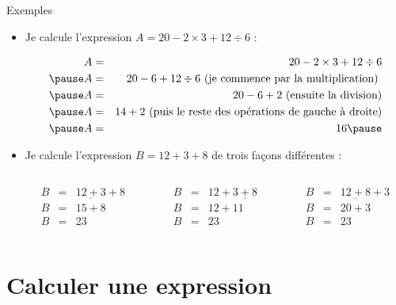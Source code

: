 \documentclass[xcolor={dvipsnames}]{beamer}
\newcommand{\myitem}{\item[\textbullet]}
\begin{document}
\begin{frame}
	\begin{exampleblock}{Exemples}
		\begin{itemize}
			\myitem Je calcule l'expression $A= 20 - 2 \times 3 + 12 \div 6$ :\pause
			
			\vspace*{-0.5cm}
			
			\begin{eqnarray*}
				A &=& 20 - 2 \times 3 + 12 \div 6 \\ \pause
				A &=& 20 - 6 + 12 \div 6 \text{ (je commence par la multiplication) }\\ \pause
				A &=& 20 - 6 + 2 \text{ (ensuite la division)} \\ \pause
				A &=& 14 + 2 \text{ (puis le reste des opérations de gauche à droite)}\\ \pause
				A &=& 16 \pause
			\end{eqnarray*}
			
			\myitem Je calcule l'expression $B= 12 + 3 +8$ de trois façons différentes : \pause
			
			\vspace*{-0.5cm}
			\begin{columns}
				\begin{column}{0.33\textwidth}
					\begin{eqnarray*}
						B &=& \underline{12 + 3} + 8 \\
						B &=& 15 + 8 \\
						B &=& 23
					\end{eqnarray*}
				\end{column}\pause
				
				\begin{column}{0.33\textwidth}
					\begin{eqnarray*}
						B &=& 12 + \underline{3 + 8} \\
						B &=& 12 + 11 \\
						B &=& 23
					\end{eqnarray*}
				\end{column}\pause
				
				
				\begin{column}{0.33\textwidth}
					\begin{eqnarray*}
						B &=& \underline{12 + 8} + 3 \\
						B &=& 20 + 3 \\
						B &=& 23
					\end{eqnarray*}	
				\end{column}
				
			\end{columns}
			
		\end{itemize}
	\end{exampleblock}
\end{frame}

\section{Calculer une expression}
\end{document}
